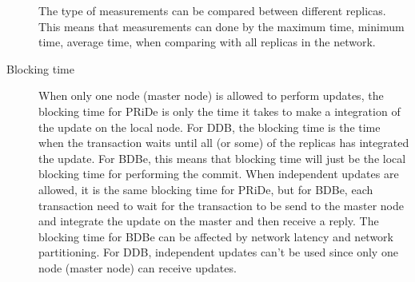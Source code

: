\begin{description}
	The type of measurements can be compared between different replicas. This means that measurements can done by the maximum time, minimum time, average time, when comparing with all replicas in the network. 


	\item[Blocking time] 

	When only one node (master node) is allowed to perform updates, the blocking time for PRiDe is only the time it takes to make a integration of the update on the local node. For DDB, the blocking time is the time when the transaction waits until all (or some) of the replicas has integrated the update. For BDBe, this means that blocking time will just be the local blocking time for performing the commit.
	When independent updates are allowed, it is the same blocking time for PRiDe, but for BDBe, each transaction need to wait for the transaction to be send to the master node and integrate the update on the master and then receive a reply. The blocking time for BDBe can be affected by network latency and network partitioning. For DDB, independent updates can't be used since only one node (master node) can receive updates.

\end{description}






